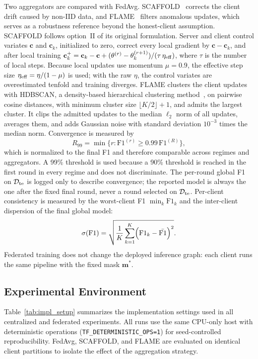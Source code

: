 \documentclass[conference]{IEEEtran}
\begin{document}
Two aggregators are compared with FedAvg.
SCAFFOLD~\cite{karimireddy2020scaffold} corrects the client drift
caused by non-IID data, and FLAME~\cite{nguyen2022flame} filters
anomalous updates, which serves as a robustness reference beyond the
honest-client assumption. SCAFFOLD follows
option~II of its original formulation. Server and client control variates $\mathbf{c}$ and
$\mathbf{c}_k$, initialized to zero, correct every local gradient by
$\mathbf{c}-\mathbf{c}_k$, and after local training
$\mathbf{c}_k^{+}=\mathbf{c}_k-\mathbf{c}+(\theta^{(r)}-
\theta_k^{(r+1)})/(\tau\,\eta_{\rm eff})$, where $\tau$ is the number
of local steps. Because local updates use momentum $\mu=0.9$, the
effective step size $\eta_{\rm eff}=\eta/(1-\mu)$ is used; with the
raw $\eta$, the control variates are overestimated tenfold and
training diverges. FLAME clusters the client
updates with HDBSCAN, a density-based hierarchical clustering
method~\cite{campello2013hdbscan}, on pairwise cosine distances, with minimum cluster size
$\lfloor K/2\rfloor+1$, and admits the largest cluster. It clips the
admitted updates to the median $\ell_2$ norm of all updates, averages
them, and adds Gaussian noise with standard deviation $10^{-3}$ times
the median norm. Convergence is measured by
\begin{equation}
R_{99}=\min\bigl\{r:\mathrm{F1}^{(r)}\ge
0.99\,\mathrm{F1}^{(R)}\bigr\},
\label{eq:r90}
\end{equation}
which is normalized to the final F1 and therefore comparable across
regimes and aggregators.
A 99\% threshold is used
because a 90\% threshold is reached in the first round in every regime
and does not discriminate. The per-round global F1 on
$\mathcal{D}_{\rm te}$ is logged only to describe convergence; the
reported model is always the one after the fixed final round, never a
round selected on $\mathcal{D}_{\rm te}$. Per-client consistency is
measured by the worst-client F1 $\min_k\mathrm{F1}_k$ and the
inter-client dispersion of the final global
model:
\begin{equation}
\sigma\!\left(\mathrm{F1}\right)=
\sqrt{\frac{1}{K}\sum_{k=1}^{K}
\Bigl(\mathrm{F1}_k-\bar{\mathrm{F1}}\Bigr)^2}.
\label{eq:client_var_round}
\end{equation}
Federated training does not change the deployed inference graph:
each client runs the same pipeline with the fixed mask
$\mathbf{m}^{*}$.

\subsection{Experimental Environment}
\label{subsec:impl_details}
Table~\ref{tab:impl_setup} summarizes the implementation settings
used in all centralized and federated experiments. All runs use the
same CPU-only host with deterministic operations
(\texttt{TF\_DETERMINISTIC\_OPS=1}) for seed-controlled
reproducibility. FedAvg, SCAFFOLD, and FLAME are evaluated on
identical client partitions to isolate the effect of the aggregation
strategy.
\end{document}
